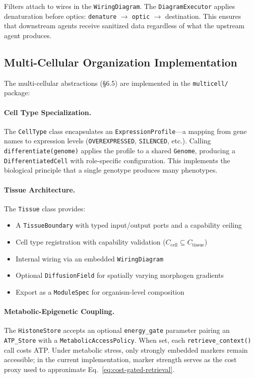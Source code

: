 Filters attach to wires in the \texttt{WiringDiagram}. The \texttt{DiagramExecutor} applies denaturation before optics: \texttt{denature} $\to$ \texttt{optic} $\to$ destination. This ensures that downstream agents receive sanitized data regardless of what the upstream agent produces.

\subsection{Multi-Cellular Organization Implementation}

The multi-cellular abstractions (\S6.5) are implemented in the \texttt{multicell/} package:

\paragraph{Cell Type Specialization.}
The \texttt{CellType} class encapsulates an \texttt{ExpressionProfile}---a mapping from gene names to expression levels (\texttt{OVEREXPRESSED}, \texttt{SILENCED}, etc.). Calling \texttt{differentiate(genome)} applies the profile to a shared \texttt{Genome}, producing a \texttt{DifferentiatedCell} with role-specific configuration. This implements the biological principle that a single genotype produces many
phenotypes.

\paragraph{Tissue Architecture.}
The \texttt{Tissue} class provides:
\begin{itemize}[leftmargin=*]
\item A \texttt{TissueBoundary} with typed input/output ports and a capability ceiling
\item Cell type registration with capability validation ($C_{\text{cell}} \subseteq C_{\text{tissue}}$)
\item Internal wiring via an embedded \texttt{WiringDiagram}
\item Optional \texttt{DiffusionField} for spatially varying morphogen gradients
\item Export as a \texttt{ModuleSpec} for organism-level composition
\end{itemize}

\paragraph{Metabolic-Epigenetic Coupling.}
The \texttt{HistoneStore} accepts an optional \texttt{energy\_gate} parameter pairing an \texttt{ATP\_Store} with a \texttt{MetabolicAccessPolicy}. When set, each \texttt{retrieve\_context()} call costs ATP. Under metabolic stress, only strongly embedded markers remain accessible; in the current implementation, marker strength serves as the cost proxy used to approximate Eq.~\eqref{eq:cost-gated-retrieval}.

